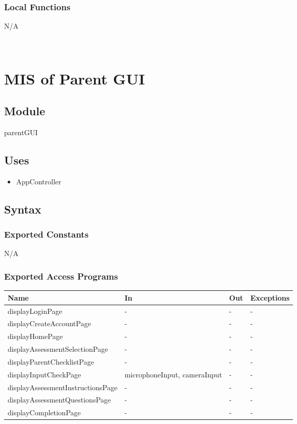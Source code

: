 \documentclass[12pt, titlepage]{article}
\begin{document}
\subsubsection{Local Functions}
N/A

~\newpage

\section{MIS of Parent GUI \label{mParentGUI} }

\subsection{Module}

parentGUI

\subsection{Uses}

\begin{itemize}
  \item AppController
\end{itemize}

\subsection{Syntax}

\subsubsection{Exported Constants}

N/A

\subsubsection{Exported Access Programs}

\begin{center}
\begin{tabular}{p{8cm} p{4cm} p{2cm} p{2cm}}
\hline
\textbf{Name} & \textbf{In} & \textbf{Out} & \textbf{Exceptions} \\
\hline
displayLoginPage & - & - & - \\
displayCreateAccountPage & - & - & - \\
displayHomePage & - & - & - \\
displayAssessmentSelectionPage & - & - & - \\
displayParentChecklistPage & - & - & - \\
displayInputCheckPage & microphoneInput, cameraInput & - & - \\
displayAssessmentInstructionsPage & - & - & - \\
displayAssessmentQuestionsPage & - & - & - \\
displayCompletionPage & - & - & - \\
\hline
\end{tabular}
\end{center}
\end{document}
